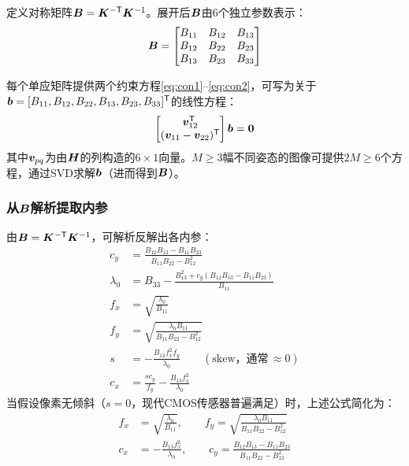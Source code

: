\begin{definition}
定义对称矩阵$\bm{B} = \bm{K}^{-\mathsf{T}}\bm{K}^{-1}$。展开后$\bm{B}$由6个独立参数表示：
\begin{equation}
\bm{B} =
\begin{bmatrix}
B_{11} & B_{12} & B_{13} \\
B_{12} & B_{22} & B_{23} \\
B_{13} & B_{23} & B_{33}
\end{bmatrix}
\label{eq:B-matrix}
\end{equation}
\end{definition}

每个单应矩阵提供两个约束方程\eqref{eq:con1}--\eqref{eq:con2}，可写为关于$\bm{b} = [B_{11}, B_{12}, B_{22}, B_{13}, B_{23}, B_{33}]^{\mathsf{T}}$的线性方程：
\begin{equation}
\begin{bmatrix}
\bm{v}_{12}^{\mathsf{T}} \\ (\bm{v}_{11} - \bm{v}_{22})^{\mathsf{T}}
\end{bmatrix}
\bm{b} = \bm{0}
\label{eq:v-matrix}
\end{equation}
其中$\bm{v}_{pq}$为由$\bm{H}$的列构造的$6\times 1$向量。$M \ge 3$幅不同姿态的图像可提供$2M \ge 6$个方程，通过SVD求解$\bm{b}$（进而得到$\bm{B}$）。

\subsubsection{从\texorpdfstring{$\bm{B}$}{B}解析提取内参}

由$\bm{B} = \bm{K}^{-\mathsf{T}}\bm{K}^{-1}$，可解析反解出各内参：
\begin{align}
c_y &= \frac{B_{12}B_{13} - B_{11}B_{23}}{B_{11}B_{22} - B_{12}^2} \label{eq:extract-cy} \\[4pt]
\lambda_0 &= B_{33} - \frac{B_{13}^2 + c_y(B_{12}B_{13} - B_{11}B_{23})}{B_{11}} \label{eq:extract-lambda} \\[4pt]
f_x &= \sqrt{\frac{\lambda_0}{B_{11}}} \label{eq:extract-fx} \\[4pt]
f_y &= \sqrt{\frac{\lambda_0 B_{11}}{B_{11}B_{22} - B_{12}^2}} \label{eq:extract-fy} \\[4pt]
s   &= -\frac{B_{12} f_x^2 f_y}{\lambda_0} \qquad (\text{skew，通常}\, \approx 0) \label{eq:extract-s} \\[4pt]
c_x &= \frac{s c_y}{f_y} - \frac{B_{13} f_x^2}{\lambda_0} \label{eq:extract-cx}
\end{align}
当假设像素无倾斜（$s=0$，现代CMOS传感器普遍满足）时，上述公式简化为：
\begin{align}
f_x &= \sqrt{\frac{\lambda_0}{B_{11}}}, \qquad
f_y = \sqrt{\frac{\lambda_0 B_{11}}{B_{11}B_{22} - B_{12}^2}} \label{eq:simple-f} \\
c_x &= -\frac{B_{13}f_x^2}{\lambda_0}, \qquad
c_y = \frac{B_{12}B_{13} - B_{11}B_{23}}{B_{11}B_{22} - B_{12}^2} \label{eq:simple-c}
\end{align}
